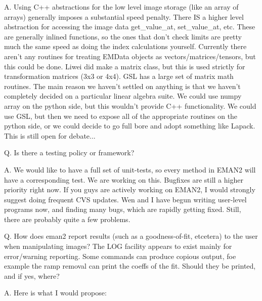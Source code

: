  A.  Using C++ abstractions for the low level image storage (like an array of arrays) generally imposes a substantial speed penalty. There IS a higher level abstraction for accessing the image data get\_value\_at, set\_value\_at, etc. These are generally inlined functions, so the ones that don't check limits are pretty much the same speed as doing the index calculations yourself. Currently there aren't any routines for treating EMData objects as vectors/matrices/tensors, but this could be done. Liwei did make a matrix class, but this is used strictly for transformation matrices (3x3 or 4x4). GSL has a large set of matrix math routines. The main reason we haven't settled on anything is that we haven't completely decided on a particular linear algebra suite. We could use numpy array on the python side, but this wouldn't provide C++ functionality. We could use GSL, but then we need to expose all of the appropriate routines on the python side, or we could decide to go full bore and adopt something like Lapack. This is still open for debate... 


 Q. Is there a testing policy or framework?


 A. We would like to have a full set of unit-tests, so every method in EMAN2 will have a corresponding test. We are working on this. Bugfixes are still a higher priority right now. If you guys are actively working on EMAN2, I would strongly suggest doing frequent CVS updates. Wen and I have begun writing user-level programs now, and finding many bugs, which are rapidly getting fixed. Still, there are probably quite a few problems. 


 Q. How does eman2 report results (such as a goodness-of-fit, etcetera) to the user when manipulating images? The LOG facility appears to  exist mainly for error/warning reporting. Some commands can produce copious output, foe example the ramp removal can print the coeffs of the fit. Should they be printed, and if yes, where?


 A. Here is what I would propose:

